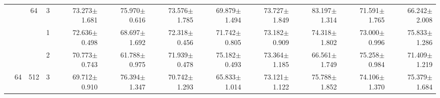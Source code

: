 \begin{table}[htpb]
{\begin{tabular}{c|c|c|c|rr|rr|rr|rr}
                                 &                                                                                 & \multirow{-3}{*}{64}                                                                   & 3                                                                                         & 73.273$\pm$1.681                        & 75.970$\pm$0.616                        & 73.576$\pm$1.785                        & 69.879$\pm$1.494                        & 73.727$\pm$1.849                        & {\color[HTML]{FE0000} 83.197$\pm$1.314} & 71.591$\pm$1.765                        & 66.242$\pm$2.008                       \\ \cline{3-12} 
                                 &                                                                                 &                                                                                        & 1                                                                                         & 72.636$\pm$0.498                        & 68.697$\pm$1.692                        & 72.318$\pm$0.456                        & 71.742$\pm$0.805                        & 73.182$\pm$0.909                        & 74.318$\pm$1.802                        & 73.000$\pm$0.996                        & 75.833$\pm$1.286                       \\
                                 &                                                                                 &                                                                                        & 2                                                                                         & 70.773$\pm$0.743                        & 61.788$\pm$0.975                        & 71.939$\pm$0.478                        & 75.182$\pm$0.493                        & 73.364$\pm$1.185                        & 66.561$\pm$1.749                        & 75.258$\pm$0.984                        & 71.409$\pm$1.219                       \\
                                 & \multirow{-6}{*}{64}                                                            & \multirow{-3}{*}{512}                                                                  & 3                                                                                         & 69.712$\pm$0.910                        & 76.394$\pm$1.347                        & 70.742$\pm$1.293                        & 65.833$\pm$1.014                        & 73.121$\pm$1.122                        & 75.788$\pm$1.852                        & 74.106$\pm$1.370                        & 75.379$\pm$1.684                       \\ \cline{2-12} 

\end{tabular}}
\end{table}
